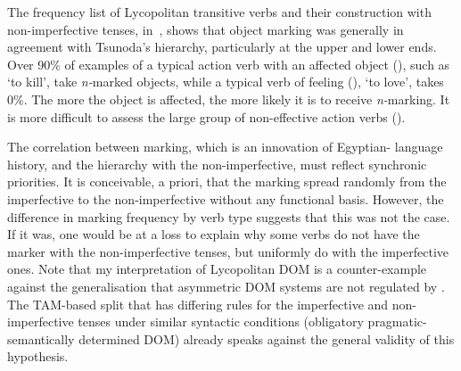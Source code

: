 \documentclass[output=paper]{LSP/langsci}
\begin{document}
The frequency list of Lycopolitan transitive verbs and their construction with non-imperfective tenses, in~, shows that object marking was generally in agreement with Tsunoda’s  hierarchy, particularly at the upper and lower ends. Over 90\% of examples of a typical action verb with an affected object (), such as ‘to kill’, take\textit{ n-}marked objects, while a typical verb of feeling (), ‘to love’, takes 0\%. The more the object is affected, the more likely it is to receive \textit{n-}marking. It is more difficult to assess the large group of non-effective action verbs (). 

The correlation between marking, which is an innovation of Egyptian- language history, and the  hierarchy with the non-imperfective, must reflect synchronic priorities. It is conceivable, a priori, that the marking spread randomly from the imperfective to the non-imperfective without any functional basis. However, the difference in marking frequency by verb type suggests that this was not the case. If it was, one would be at a loss to explain why some verbs do not have the marker with the non-imperfective tenses, but uniformly do with the imperfective ones. Note that my interpretation of Lycopolitan DOM is a counter-example against the generalisation that asymmetric DOM systems are not regulated by  \citep{Iemmolo2013Symmetric}. The TAM-based split that has differing rules for the imperfective and non-imperfective tenses under similar syntactic conditions (obligatory \vs pragmatic-semantically determined DOM) already speaks against the general validity of this hypothesis. 
\end{document}
